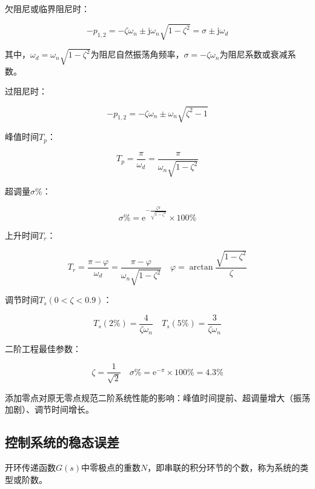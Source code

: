 \documentclass[cn, blue, normal, 12pt]{elegantnote}
\begin{document}
欠阻尼或临界阻尼时：

\begin{equation}
    -p_{1,2}=-\zeta\omega_n\pm\text{j}\omega_n\sqrt{1-\zeta^2}=\sigma\pm\text{j}\omega_d
\end{equation}

其中，$\omega_d=\omega_n\sqrt{1-\zeta^2}$为阻尼自然振荡角频率，$\sigma=-\zeta\omega_n$为阻尼系数或衰减系数。

过阻尼时：

\begin{equation}
    -p_{1,2}=-\zeta\omega_n\pm\omega_n\sqrt{\zeta^2-1}
\end{equation}

峰值时间$T_p$：

\begin{equation}
    T_p=\frac{\pi}{\omega_d}=\frac{\pi}{\omega_n\sqrt{1-\zeta^2}}
\end{equation}

超调量$\sigma\%$：

\begin{equation}
    \sigma\%=\text{e}^{-\frac{\zeta\pi}{\sqrt{1-\zeta^2}}}\times 100\%
\end{equation}

上升时间$T_r$：

\begin{equation}
    T_r=\frac{\pi-\varphi}{\omega_d}=\frac{\pi-\varphi}{\omega_n\sqrt{1-\zeta^2}} \quad \varphi=\arctan{\frac{\sqrt{1-\zeta^2}}{\zeta}}
\end{equation}

调节时间$T_s(0<\zeta<0.9)$：

\begin{equation}
    T_s(2\%)=\frac{4}{\zeta\omega_n} \quad T_s(5\%)=\frac{3}{\zeta\omega_n}
\end{equation}

二阶工程最佳参数：

\begin{equation}
    \zeta=\frac{1}{\sqrt{2}} \quad \sigma\%=\text{e}^{-\pi}\times 100\%=4.3\%
\end{equation}

添加零点对原无零点规范二阶系统性能的影响：峰值时间提前、超调量增大（振荡加剧）、调节时间增长。

\subsection{控制系统的稳态误差}

开环传递函数$G(s)$中零极点的重数$N$，即串联的积分环节的个数，称为系统的类型或阶数。
\end{document}
